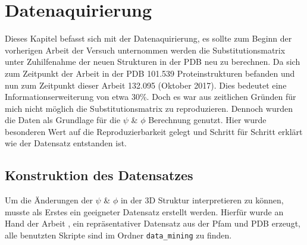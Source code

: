 \chapter[Datenaquirierung]{Datenaquirierung}
\label{chap:Datenaquirierung}

Dieses Kapitel befasst sich mit der Datenaquirierung, es sollte zum Beginn der vorherigen Arbeit der Versuch unternommen werden die Substitutionsmatrix unter Zuhilfenahme der neuen Strukturen in der \ac{PDB} neu zu berechnen. Da sich zum Zeitpunkt der Arbeit \cite{Mathias.2014} in der \ac{PDB} 101.539 Proteinstrukturen befanden und nun zum Zeitpunkt dieser Arbeit 132.095 (Oktober 2017). Dies bedeutet eine Informationserweiterung von etwa 30\%. Doch es war aus zeitlichen Gründen für mich nicht möglich die Substitutionsmatrix zu reproduzieren. Dennoch wurden die Daten als Grundlage für die $\psi$ \& $\phi$ Berechnung genutzt. Hier wurde besonderen Wert auf die Reproduzierbarkeit gelegt und Schritt für Schritt erklärt wie der Datensatz entstanden ist.



\section{Konstruktion des Datensatzes}
\label{sec:konst}

Um die Änderungen der $\psi$ \& $\phi$ in der 3D Struktur interpretieren zu können, musste als Erstes ein geeigneter Datensatz erstellt werden. Hierfür wurde an Hand der Arbeit \cite{Mathias.2014}, ein repräsentativer Datensatz aus der \ac{Pfam} und \ac{PDB} erzeugt, alle benutzten Skripte sind im Ordner \texttt{data\_mining} zu finden.


